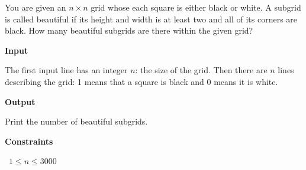 You are given an $n \times n$ grid whose each square is either black or white. A subgrid is called beautiful if its height and width is at least two and all of its corners are black. How many beautiful subgrids are there within the given grid?

\vspace{0.3cm}\noindent\textbf{Input}

The first input line has an integer $n$: the size of the grid.
Then there are $n$ lines describing the grid: 1 means that a square is black and 0 means it is white.

\vspace{0.3cm}\noindent\textbf{Output}

Print the number of beautiful subgrids.

\vspace{0.3cm}\noindent\textbf{Constraints}

\textbullet\ $1 \le n \le 3000$